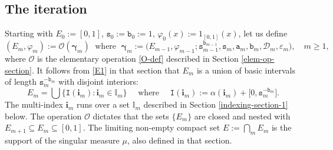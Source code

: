 \documentclass[12pt, twoside]{article}
\theoremstyle{definition}
\numberwithin{equation}{section}
\begin{document}
\subsection{The iteration} \label{iteration-subsection}
Starting with $E_0 := [0,1]$, $\mathtt s_0 := \mathtt b_0 := 1$, $\varphi_0(x) := 1_{[0,1]}(x)$, let us define 
\begin{equation} \label{iteration} 
(E_{m}, \varphi_m) := \mathscr{O}(\pmb{\gamma}_m) \; \text{ where } \; \pmb{\gamma}_m := \bigl(E_{m-1}, \varphi_{m-1}; \mathtt s_{m-1}^{\mathtt b_{m-1}}, \mathtt s_{m}, \mathtt a_m, \mathtt b_m, \mathscr{D}_m, \varepsilon_m \bigr), \quad m \geq 1, 
\end{equation} 
where $\mathscr{O}$ is the elementary operation \eqref{O-def} described in Section \ref{elem-op-section}. It follows from \eqref{E1} in that section that $E_m$ is a union of basic intervals of length $\mathtt s_m^{-\mathtt b_m}$ with disjoint interiors:  
\begin{equation} \label{def-Em}
E_m = \bigcup \bigl\{\mathtt I(\mathbf i_m) : \mathbf i_m \in \mathbb I_m \bigr\} \quad \text{ where } \quad \mathtt I(\mathbf i_m) := \alpha(\mathbf i_m) + \bigl[0, \mathtt s_m^{- \mathtt b_m} \bigr].
\end{equation} 
The multi-index $\mathbf i_m$ runs over a set $\mathbb I_m$ described in Section \ref{indexing-section-1} below. 
The operation $\mathscr O$ dictates that the sets $\{E_m\}$ are closed and nested with $E_{m+1} \subseteq E_m \subseteq [0,1]$. The limiting non-empty compact set $E := \bigcap_m E_m$ is the support of the singular measure $\mu$, also defined in that section. 
\end{document}
